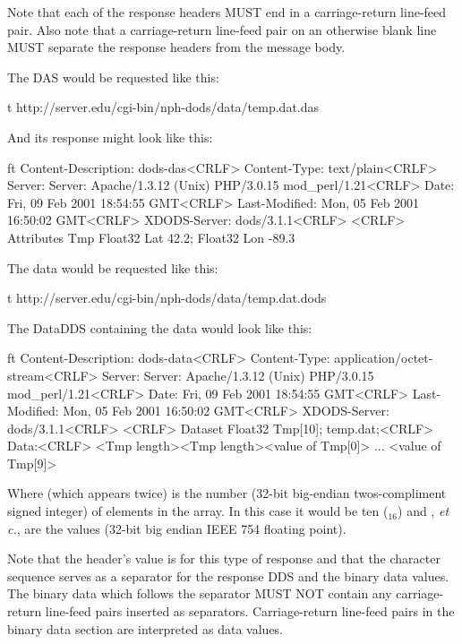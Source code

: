 \documentclass[justify]{nasa-ese}
\begin{document}
Note that each of the response headers MUST end in a carriage-return
line-feed pair. Also note that a carriage-return
line-feed pair on an otherwise blank line MUST separate the response headers
from the message body\cite{rfc2045,rfc2046}.

The DAS would be requested like this:

\begin{vcode}{t}
http://server.edu/cgi-bin/nph-dods/data/temp.dat.das
\end{vcode}

And its response might look like this:

\begin{vcode}{ft}
Content-Description: dods-das<CRLF>
Content-Type: text/plain<CRLF>
Server: Server: Apache/1.3.12 (Unix)  PHP/3.0.15 mod_perl/1.21<CRLF>
Date: Fri, 09 Feb 2001 18:54:55 GMT<CRLF>
Last-Modified: Mon, 05 Feb 2001 16:50:02 GMT<CRLF>
XDODS-Server: dods/3.1.1<CRLF>
<CRLF>
Attributes {
  Tmp {
    Float32 Lat 42.2;
    Float32 Lon -89.3
  }
}
\end{vcode}


The data would be requested like this:

\begin{vcode}{t}
http://server.edu/cgi-bin/nph-dods/data/temp.dat.dods
\end{vcode}

The DataDDS containing the data would look like this:

\begin{vcode}{ft}
Content-Description: dods-data<CRLF>
Content-Type: application/octet-stream<CRLF>
Server: Server: Apache/1.3.12 (Unix)  PHP/3.0.15 mod_perl/1.21<CRLF>
Date: Fri, 09 Feb 2001 18:54:55 GMT<CRLF>
Last-Modified: Mon, 05 Feb 2001 16:50:02 GMT<CRLF>
XDODS-Server: dods/3.1.1<CRLF>
<CRLF>
Dataset {
  Float32 Tmp[10];
} temp.dat;<CRLF>
Data:<CRLF>
<Tmp length><Tmp length><value of Tmp[0]> ... <value of Tmp[9]>
\end{vcode}

Where  (which appears twice) is the number (32-bit
 big-endian twos-compliment signed integer) of elements in the array. In this
 case it would be ten ($_{16}$) and ,
 {\it et c.}, are the values (32-bit big endian IEEE 754 floating point).

Note that the  header's value is
 for this type of response and that the
character sequence  serves as a separator for the
response DDS and the binary data values.
\label{CRLF-binary-fix}
The binary data which follows the  separator
MUST NOT contain any carriage-return line-feed pairs inserted as
separators. Carriage-return line-feed pairs in the binary data section
are interpreted as data values.
\end{document}
